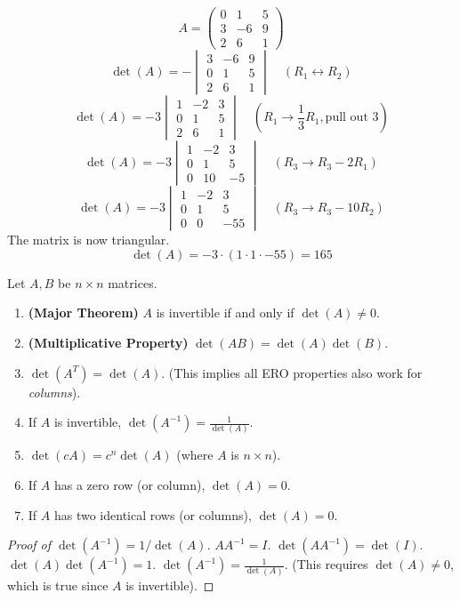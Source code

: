 \documentclass[oneside]{book}
\begin{document}
\begin{example}
\[ A = \begin{pmatrix} 0 & 1 & 5 \\ 3 & -6 & 9 \\ 2 & 6 & 1 \end{pmatrix} \]
\[ \det(A) = - \begin{vmatrix} 3 & -6 & 9 \\ 0 & 1 & 5 \\ 2 & 6 & 1 \end{vmatrix} \quad (R_1 \leftrightarrow R_2) \]
\[ \det(A) = -3 \begin{vmatrix} 1 & -2 & 3 \\ 0 & 1 & 5 \\ 2 & 6 & 1 \end{vmatrix} \quad (R_1 \to \frac{1}{3}R_1, \text{pull out } 3) \]
\[ \det(A) = -3 \begin{vmatrix} 1 & -2 & 3 \\ 0 & 1 & 5 \\ 0 & 10 & -5 \end{vmatrix} \quad (R_3 \to R_3 - 2R_1) \]
\[ \det(A) = -3 \begin{vmatrix} 1 & -2 & 3 \\ 0 & 1 & 5 \\ 0 & 0 & -55 \end{vmatrix} \quad (R_3 \to R_3 - 10R_2) \]
The matrix is now triangular.
\[ \det(A) = -3 \cdot (1 \cdot 1 \cdot -55) = 165 \]
\end{example}

\begin{property}
Let $A, B$ be $n \times n$ matrices.
\begin{enumerate}
    \item \textbf{(Major Theorem)} $A$ is invertible if and only if $\det(A) \neq 0$.
    \item \textbf{(Multiplicative Property)} $\det(AB) = \det(A)\det(B)$.
    \item $\det(A^T) = \det(A)$. (This implies all ERO properties also work for \emph{columns}).
    \item If $A$ is invertible, $\det(A^{-1}) = \frac{1}{\det(A)}$.
    \item $\det(cA) = c^n \det(A)$ (where $A$ is $n \times n$).
    \item If $A$ has a zero row (or column), $\det(A) = 0$.
    \item If $A$ has two identical rows (or columns), $\det(A) = 0$.
\end{enumerate}
\end{property}
\begin{proof}[Proof of $\det(A^{-1}) = 1/\det(A)$]
$A A^{-1} = I$.
$\det(A A^{-1}) = \det(I)$.
$\det(A) \det(A^{-1}) = 1$.
$\det(A^{-1}) = \frac{1}{\det(A)}$. (This requires $\det(A) \neq 0$, which is true since $A$ is invertible).
\end{proof}
\end{document}
